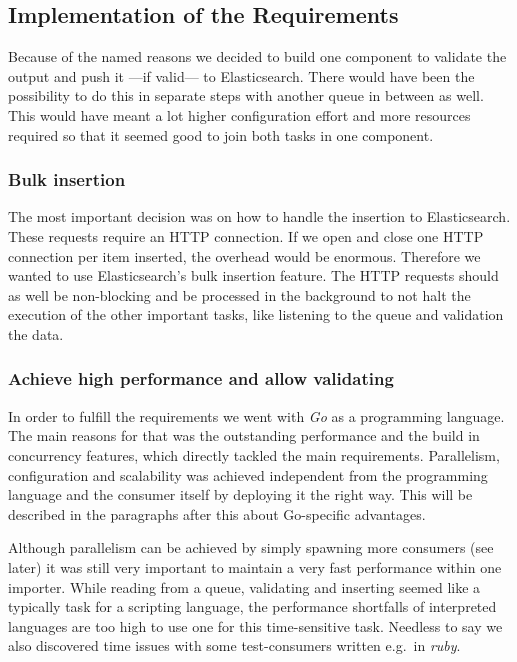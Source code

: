 \subsection{Implementation of the
Requirements}\label{implementation-of-the-requirements}

Because of the named reasons we decided to build one component to
validate the output and push it ---if valid--- to Elasticsearch. There
would have been the possibility to do this in separate steps with
another queue in between as well. This would have meant a lot higher
configuration effort and more resources required so that it seemed good
to join both tasks in one component.

\subsubsection{Bulk insertion}\label{bulk-insertion}

The most important decision was on how to handle the insertion to
Elasticsearch. These requests require an HTTP connection. If we open and
close one HTTP connection per item inserted, the overhead would be
enormous. Therefore we wanted to use Elasticsearch's bulk insertion
feature. The HTTP requests should as well be non-blocking and be
processed in the background to not halt the execution of the other
important tasks, like listening to the queue and validation the data.

\subsubsection{Achieve high performance and allow
validating}\label{achieve-high-performance-and-allow-validating}

In order to fulfill the requirements we went with \emph{Go} as a
programming language. The main reasons for that was the outstanding
performance and the build in concurrency features, which directly
tackled the main requirements. Parallelism, configuration and
scalability was achieved independent from the programming language and
the consumer itself by deploying it the right way. This will be
described in the paragraphs after this about Go-specific advantages.

Although parallelism can be achieved by simply spawning more consumers
(see later) it was still very important to maintain a very fast
performance within one importer. While reading from a queue, validating
and inserting seemed like a typically task for a scripting language, the
performance shortfalls of interpreted languages are too high to use one
for this time-sensitive task. Needless to say we also discovered time
issues with some test-consumers written e.g.~in \emph{ruby}.

